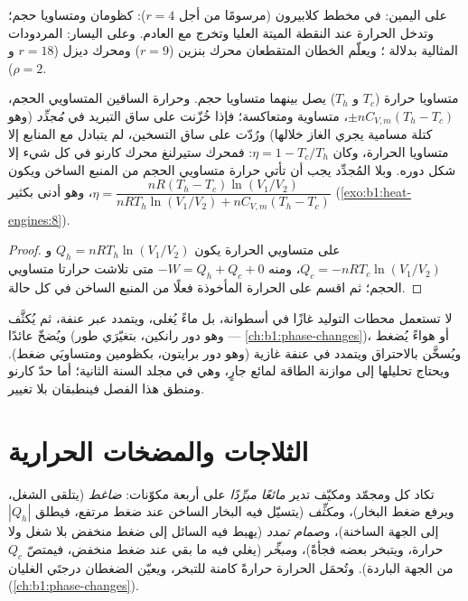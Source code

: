 \begin{omfigure}
{\small على اليمين:  في مخطط كلابيرون (مرسومًا من أجل $r = 4$): كظومان
ومتساويا حجم؛ وتدخل الحرارة عند النقطة الميتة العليا
وتخرج مع العادم. وعلى اليسار: المردودات المثالية بدلالة
؛ ويعلّم الخطان المتقطعان محرك بنزين ($r = 9$) ومحرك
ديزل ($r = 18$ و $\rho = 2$).}
\end{omfigure}

\begin{proposition}\label{prop:b1:heat-engines:stirling}
متساويا حرارة ($T_c$ و $T_h$) يصل بينهما متساويا حجم. وحرارة
الساقين المتساويي الحجم، $\pm nC_{V,m}(T_h - T_c)$، متساوية ومتعاكسة؛ فإذا
خُزّنت على ساق التبريد في \emph{مُجدِّد} (وهو كتلة مسامية يجري
الغاز خلالها) ورُدّت على ساق التسخين، لم يتبادل مع المنابع
إلا متساويا الحرارة، وكان $\eta = 1 - T_c/T_h$: فمحرك ستيرلنغ
محرك كارنو في كل شيء إلا شكل دوره. وبلا المُجدِّد يجب
أن تأتي حرارة متساويي الحجم من المنبع الساخن ويكون
$\eta = \dfrac{nR(T_h - T_c)\ln(V_1/V_2)}{nRT_h\ln(V_1/V_2) + nC_{V,m}(T_h - T_c)}$،
وهو أدنى بكثير (\cref{exo:b1:heat-engines:8}).
\end{proposition}

\begin{proof}
على متساويي الحرارة يكون $Q_h = nRT_h\ln(V_1/V_2)$ و $Q_c = -nRT_c\ln(V_1/V_2)$، ومنه
$-W = Q_h + Q_c + 0$ متى تلاشت حرارتا متساويي الحجم؛ ثم اقسم على الحرارة
المأخوذة فعلًا من المنبع الساخن في كل حالة.
\end{proof}

\begin{remark}\label{rem:b1:heat-engines:turbines}
لا تستعمل محطات التوليد غازًا في أسطوانة، بل ماءً يُغلى،
ويتمدد عبر عنفة، ثم يُكثَّف ويُضخّ عائدًا (وهو دور
رانكين، بتغيّرَي طور --- \cref{ch:b1:phase-changes})، أو هواءً
يُضغط ويُسخَّن بالاحتراق ويتمدد في عنفة غازية (وهو
دور برايتون، بكظومين ومتساويَي ضغط). ويحتاج تحليلها إلى
موازنة الطاقة لمائع جارٍ، وهي في مجلد السنة الثانية؛ أما
حدّ كارنو ومنطق هذا الفصل فينطبقان بلا تغيير.
\end{remark}

\section{الثلاجات والمضخات الحرارية}

\begin{definition}\label{def:b1:heat-engines:vapourcycle}
تكاد كل  ومجمّد ومكيّف  تدير
\emph{مائعًا مبرِّدًا} على أربعة مكوّنات: \emph{ضاغط}
(يتلقى الشغل، ويرفع ضغط البخار)، و\emph{مكثِّف}
(يتسيّل فيه البخار الساخن عند ضغط مرتفع، فيطلق
$|Q_h|$ إلى الجهة الساخنة)، و\emph{صمام تمدد} (يهبط فيه السائل إلى
ضغط منخفض بلا شغل ولا حرارة، ويتبخر بعضه فجأةً)، و\emph{مبخِّر}
(يغلي فيه ما بقي عند ضغط منخفض، فيمتصّ $Q_c$ من
الجهة الباردة). وتُحمَل الحرارة حرارةً كامنة للتبخر،
ويعيّن الضغطان درجتَي الغليان
(\cref{ch:b1:phase-changes}).
\end{definition}

